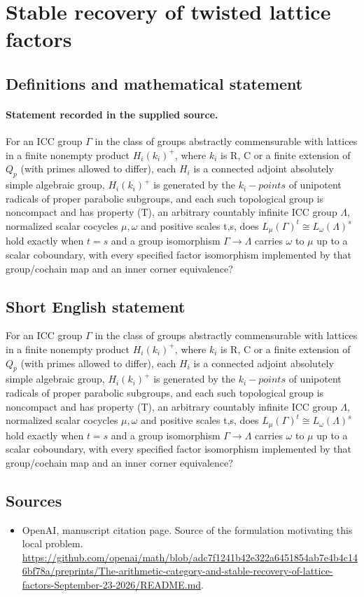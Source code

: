 \documentclass[11pt]{article}
\begin{document}
\section*{Stable recovery of twisted lattice factors}\label{30007316}
\subsection{Definitions and mathematical statement}
\paragraph{Statement recorded in the supplied source.}
For an ICC group $\Gamma $ in the class of groups abstractly commensurable with lattices in a finite nonempty product $H_i(k_i)^+$, where $k_i$ is R, C or a finite extension of $Q_p$ (with primes allowed to differ), each $H_i$ is a connected adjoint absolutely simple algebraic group, $H_i(k_i)^+$ is generated by the $k_i-points$ of unipotent radicals of proper parabolic subgroups, and each such topological group is noncompact and has property (T), an arbitrary countably infinite ICC group $\Lambda $, normalized scalar cocycles $\mu ,\omega $ and positive scales t,s, does $L_\mu (\Gamma )^t\cong L_\omega (\Lambda )^s$ hold exactly when $t=s$ and a group isomorphism $\Gamma \to \Lambda $ carries $\omega $ to $\mu $ up to a scalar coboundary, with every specified factor isomorphism implemented by that group/cochain map and an inner corner equivalence?
\subsection{Short English statement}
For an ICC group $\Gamma $ in the class of groups abstractly commensurable with lattices in a finite nonempty product $H_i(k_i)^+$, where $k_i$ is R, C or a finite extension of $Q_p$ (with primes allowed to differ), each $H_i$ is a connected adjoint absolutely simple algebraic group, $H_i(k_i)^+$ is generated by the $k_i-points$ of unipotent radicals of proper parabolic subgroups, and each such topological group is noncompact and has property (T), an arbitrary countably infinite ICC group $\Lambda $, normalized scalar cocycles $\mu ,\omega $ and positive scales t,s, does $L_\mu (\Gamma )^t\cong L_\omega (\Lambda )^s$ hold exactly when $t=s$ and a group isomorphism $\Gamma \to \Lambda $ carries $\omega $ to $\mu $ up to a scalar coboundary, with every specified factor isomorphism implemented by that group/cochain map and an inner corner equivalence?
\subsection{Sources}
\begin{itemize}
\item[S1] OpenAI, manuscript citation page. Source of the formulation motivating this local problem.
\url{https://github.com/openai/math/blob/adc7f1241b42e322a6451854ab7e4b4c146bf78a/preprints/The-arithmetic-category-and-stable-recovery-of-lattice-factors-September-23-2026/README.md}.
\end{itemize}
\end{document}
